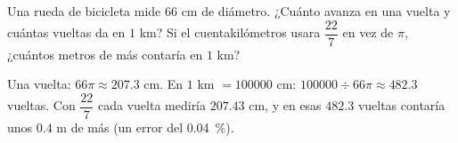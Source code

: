 \documentclass[11pt]{article}
\begin{document}
\begin{preguntas}
\pregunta Una rueda de bicicleta mide $66$ cm de diámetro. ¿Cuánto avanza en una vuelta y
cuántas vueltas da en $1$ km? Si el cuentakilómetros usara $\dfrac{22}{7}$ en vez de
$\pi$, ¿cuántos metros de más contaría en $1$ km?
\begin{solucion}[4cm]
Una vuelta: $66\pi \approx \num{207,3}$ cm. En $1$ km $= \num{100000}$ cm:
$\num{100000} \div 66\pi \approx \num{482,3}$ vueltas. Con $\dfrac{22}{7}$ cada vuelta
mediría $\num{207,43}$ cm, y en esas $\num{482,3}$ vueltas contaría unos $\num{0,4}$ m de
más (un error del \qty{0,04}{\percent}).
\end{solucion}

\end{preguntas}
\end{document}

